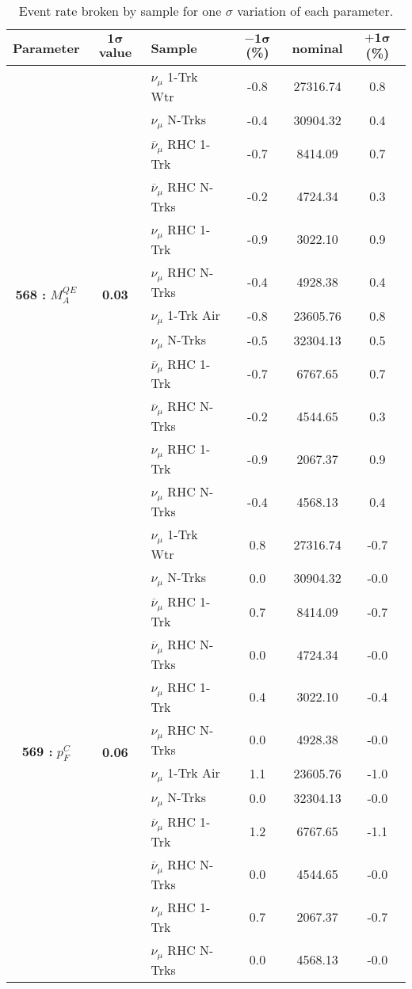 \addtocounter{table}{-1}
\begin{table}[ht!]
\centering
\begin{tabular}{ c  c  l  c  c  c }
\midrule[1.3pt]
\textbf{Parameter} & \textbf{$\mathbf{1\sigma}$ value} & \textbf{Sample} & \textbf{$\mathbf{-1\sigma}$ (\%)}  &  \textbf{nominal}  &  \textbf{$\mathbf{+1\sigma}$ (\%)} \\
\midrule[1.3pt]
\multirow{12}{*}{\textbf{568 : }$M_A^{QE}$} & \multirow{12}{*}{\textbf{0.03}} & $\nu_\mu$ 1-Trk Wtr &   -0.8 &  27316.74 &   0.8 \\ 
 &  & $\nu_\mu$ N-Trks &   -0.4 &  30904.32 &   0.4 \\ 
 &  & $\overline{\nu}_\mu$ RHC 1-Trk &   -0.7 &  8414.09 &   0.7 \\ 
 &  & $\overline{\nu}_\mu$ RHC N-Trks &   -0.2 &  4724.34 &   0.3 \\ 
 &  & $\nu_\mu$ RHC 1-Trk &   -0.9 &  3022.10 &   0.9 \\ 
 &  & $\nu_\mu$ RHC N-Trks &   -0.4 &  4928.38 &   0.4 \\ 
 &  & $\nu_\mu$ 1-Trk Air &   -0.8 &  23605.76 &   0.8 \\ 
 &  & $\nu_\mu$ N-Trks &   -0.5 &  32304.13 &   0.5 \\ 
 &  & $\overline{\nu}_\mu$ RHC 1-Trk &   -0.7 &  6767.65 &   0.7 \\ 
 &  & $\overline{\nu}_\mu$ RHC N-Trks &   -0.2 &  4544.65 &   0.3 \\ 
 &  & $\nu_\mu$ RHC 1-Trk &   -0.9 &  2067.37 &   0.9 \\ 
 &  & $\nu_\mu$ RHC N-Trks &   -0.4 &  4568.13 &   0.4 \\ 
\midrule[1.3pt]
\multirow{12}{*}{\textbf{569 : }$p_F^C$} & \multirow{12}{*}{\textbf{0.06}} & $\nu_\mu$ 1-Trk Wtr &   0.8 &  27316.74 &   -0.7 \\ 
 &  & $\nu_\mu$ N-Trks &   0.0 &  30904.32 &   -0.0 \\ 
 &  & $\overline{\nu}_\mu$ RHC 1-Trk &   0.7 &  8414.09 &   -0.7 \\ 
 &  & $\overline{\nu}_\mu$ RHC N-Trks &   0.0 &  4724.34 &   -0.0 \\ 
 &  & $\nu_\mu$ RHC 1-Trk &   0.4 &  3022.10 &   -0.4 \\ 
 &  & $\nu_\mu$ RHC N-Trks &   0.0 &  4928.38 &   -0.0 \\ 
 &  & $\nu_\mu$ 1-Trk Air &   1.1 &  23605.76 &   -1.0 \\ 
 &  & $\nu_\mu$ N-Trks &   0.0 &  32304.13 &   -0.0 \\ 
 &  & $\overline{\nu}_\mu$ RHC 1-Trk &   1.2 &  6767.65 &   -1.1 \\ 
 &  & $\overline{\nu}_\mu$ RHC N-Trks &   0.0 &  4544.65 &   -0.0 \\ 
 &  & $\nu_\mu$ RHC 1-Trk &   0.7 &  2067.37 &   -0.7 \\ 
 &  & $\nu_\mu$ RHC N-Trks &   0.0 &  4568.13 &   -0.0 \\ 
\midrule[1.3pt]
\end{tabular}
\centering
\caption{Event rate broken by sample for one $\sigma$ variation of each parameter.}
\end{table}
